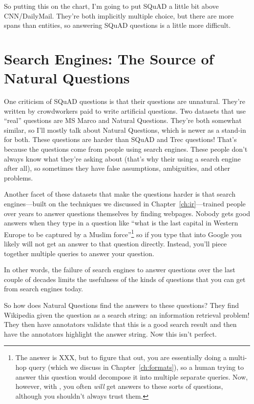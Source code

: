 So putting this on the chart, I’m going to put SQuAD a little bit
above CNN/DailyMail.  They’re both implicitly multiple choice, but
there are more spans than entities, so answering SQuAD questions is a
little more difficult.

\section{Search Engines: The Source of Natural Questions}

One criticism of SQuAD questions is that their questions are
unnatural.  They’re written by crowdworkers paid to write artificial
questions.  Two datasets that use “real” questions are MS Marco and
Natural Questions.  They’re both somewhat similar, so I’ll mostly talk
about Natural Questions, which is newer as a stand-in for both.  These
questions are harder than SQuAD and Trec questions!  That’s because
the questions come from people using search engines.  These people
don’t always know what they’re asking about (that’s why their using a
search engine after all), so sometimes they have false assumptions,
ambiguities, and other problems.

Another facet of these datasets that make the questions harder is that
search engines---built on the techniques we discussed in Chapter~\ref{ch:ir}---trained people over years to answer questions
themselves by finding webpages.  Nobody gets good answers when they
type in a question like “what is the last capital in Western Europe to
be captured by a Muslim force”\footnote{The answer is XXX, but to figure that out, you are essentially doing a multi-hop query (which we discuss in Chapter~\ref{ch:formats}), so a human trying to answer this question would decompose it into multiple separate queries.  Now, however, with , you often \emph{will} get answers to these sorts of questions, although you shouldn't always trust them. } so if you type that into Google you
likely will not get an answer to that question directly.  Instead,
you’ll piece together multiple queries to answer your question.

In other words, the failure of search engines to answer questions over
the last couple of decades limits the usefulness of the kinds of
questions that you can get from search engines today.

So how does Natural Questions find the answers to these questions?
They find Wikipedia given the question as a search string: an
information retrieval problem!  They then have annotators validate
that this is a good search result and then have the annotators
highlight the answer string.  Now this isn’t perfect.

